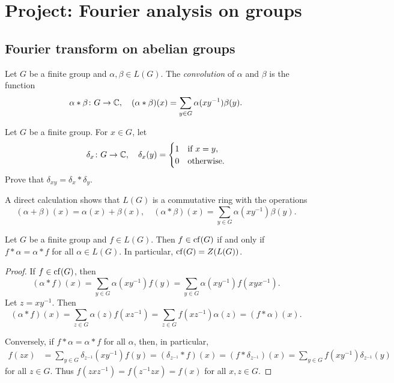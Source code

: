 \section{Project: Fourier analysis on groups}

\subsection{Fourier transform on abelian groups}

\begin{definition}
	Let $G$ be a finite group and $\alpha,\beta\in L(G)$. The \emph{convolution} of $\alpha$ and 
    $\beta$ is the function 
	\[
	\alpha*\beta\colon G\to\mathbb{C},\quad
	(\alpha*\beta)(x)=\sum_{y\in G}\alpha(xy^{-1})\beta(y).
	\]
\end{definition}

\begin{exercise}
	\label{xca:delta}
	Let $G$ be a finite group. For $x\in G$, let 
    \[
	\delta_x\colon G\to\mathbb{C},\quad
	\delta_x(y)=\begin{cases}
		1 & \text{if $x=y$},\\
		0 & \text{otherwise}.
	\end{cases}
	\]
	Prove that $\delta_{xy}=\delta_x*\delta_y$.
\end{exercise}

A direct calculation shows that $L(G)$ is a 
commutative ring with the operations
	\[
	(\alpha+\beta)(x)=\alpha(x)+\beta(x),\quad
	(\alpha*\beta)(x)=\sum_{y\in G}\alpha(xy^{-1})\beta(y).
	\]

\begin{proposition}
	Let $G$ be a finite group and $f\in L(G)$. Then 
    $f\in\operatorname{cf}(G)$ if and only if $f*\alpha=\alpha*f$ 
    for all $\alpha\in L(G)$. In particular, 
    $\operatorname{cf}(G)=Z(L(G))$. 
\end{proposition}

\begin{proof}
  If $f\in\operatorname{cf}(G)$, then 
  \[
    (\alpha*f)(x)=\sum_{y\in G}\alpha(xy^{-1})f(y)=\sum_{y\in G}\alpha(xy^{-1})f(xyx^{-1}).
  \]
  Let $z=xy^{-1}$. Then 
  \[
    (\alpha*f)(x)=\sum_{z\in G}\alpha(z)f(xz^{-1})=\sum_{z\in G}f(xz^{-1})\alpha(z)=(f*\alpha)(x).
  \]
  
  Conversely, if $f*\alpha=\alpha*f$ for all $\alpha$, 
  then, in particular, 
  \begin{align*}
    f(zx)&=\sum_{y\in G}\delta_{z^{-1}}(xy^{-1})f(y)=(\delta_{z^{-1}}*f)(x)
    =(f*\delta_{z^{-1}})(x)=\sum_{y\in G}f(xy^{-1})\delta_{z^{-1}}(y)
  \end{align*}
  for all $z\in G$. Thus $f(zxz^{-1})=f(z^{-1}zx)=f(x)$ for all
  $x,z\in
  G$.
\end{proof}

